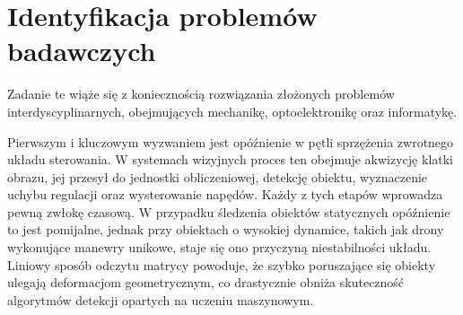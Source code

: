 \documentclass[a4paper,twoside,12pt]{book}
\begin{document}


\section{Identyfikacja problemów badawczych}

Zadanie te wiąże się z koniecznością rozwiązania złożonych problemów interdyscyplinarnych, obejmujących mechanikę, optoelektronikę oraz informatykę. 

Pierwszym i kluczowym wyzwaniem jest opóźnienie w pętli sprzężenia zwrotnego układu sterowania. W systemach wizyjnych proces ten obejmuje akwizycję klatki obrazu, jej przesył do jednostki obliczeniowej, detekcję obiektu, wyznaczenie uchybu regulacji oraz wysterowanie napędów. Każdy z tych etapów wprowadza pewną zwłokę czasową. W przypadku śledzenia obiektów statycznych opóźnienie to jest pomijalne, jednak przy obiektach o wysokiej dynamice, takich jak drony wykonujące manewry unikowe, staje się ono przyczyną niestabilności układu. Liniowy sposób odczytu matrycy powoduje, że szybko poruszające się obiekty ulegają deformacjom geometrycznym, co drastycznie obniża skuteczność algorytmów detekcji opartych na uczeniu maszynowym.
\end{document}
